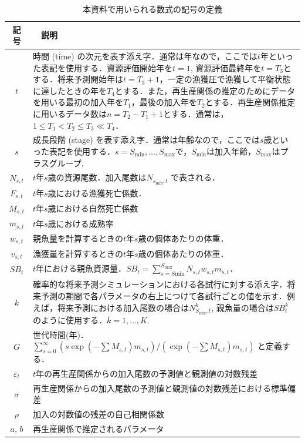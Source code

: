 \documentclass[11pt]{jsarticle}
\begin{document}
\begin{table}[h]
  \begin{tabular}{cp{14cm}} \hline
    記号    & 　説明 \\ \hline
    $t$ & 時間 (time) の次元を表す添え字．通常は年なので，ここでは$t$年といった表記を使用する．資源評価開始年を$t=1$, 資源評価最終年を$t=T_3$とする．将来予測開始年は$t=T_{3}+1$，一定の漁獲圧で漁獲して平衡状態に達したときの年を$T_4$とする．また，再生産関係の推定のためにデータを用いる最初の加入年を$T_1$，最後の加入年を$T_2$とする．再生産関係推定に用いるデータ数は$n=T_2-T_1+1$とする．通常は，$1 \leq T_1 < T_2 \leq T_3 \ll T_4$．\\
    $s$ & 成長段階 (stage) を表す添え字．通常は年齢なので，ここでは$s$歳といった表記を使用する．$s=S_{\mathrm{min}},...,S_{\mathrm{max}}$で，$S_{\mathrm{min}}$は加入年齢，$S_{\mathrm{max}}$はプラスグループ.\\ %
    $N_{s,t}$ & $t$年$s$歳の資源尾数．加入尾数は$N_{s_{\mathrm{min}},t}$ で表される．\\
    $F_{s,t}$ & $t$年$s$歳における漁獲死亡係数．\\
    $M_{s,t}$ & $t$年$s$歳における自然死亡係数\\
    $m_{s,t}$ & $t$年$s$歳における成熟率\\
    $w_{s,t}$ & 親魚量を計算するときの$t$年$s$歳の個体あたりの体重．\\
    $v_{s,t}$ & 漁獲量を計算するときの$t$年$s$歳の個体あたりの体重．\\ %
    $S\!B_{t} $ & $t$年における親魚資源量．$S\!B_t=\sum_{s=S\mathrm{min}}^{S_{\mathrm{max}}}N_{s,t} w_{s,t} m_{s,t}$．\\
    $k$      & 確率的な将来予測シミュレーションにおける各試行に対する添え字．将来予測の期間で各パラメータの右上につけて各試行ごとの値を示す．例えば，将来予測における加入尾数の場合は$N_{S_{\mathrm{min}},t}^k$, 親魚量の場合は$S\!B_t^k$のように使用する．$k=1,…,K$.\\
    $G$       & 世代時間(年)．$\sum_{s=0}^\infty (s \exp(-\sum M_{s,t}) m_{s,t})/(\exp(-\sum M_{s,t}) m_{s,t})$ と定義する．\\ %
    $\varepsilon_t$  & $t$年の再生産関係からの加入尾数の予測値と観測値の対数残差\\
    $\sigma$  & 再生産関係からの加入尾数の予測値と観測値の対数残差における標準偏差\\
    $\rho$  & 加入の対数値の残差の自己相関係数\\
    $a$, $b$  & 再生産関係で推定されるパラメータ\\ \hline  %
  \end{tabular}
  \caption{本資料で用いられる数式の記号の定義}
  \label{table_definition} 
\end{table}
\end{document}
